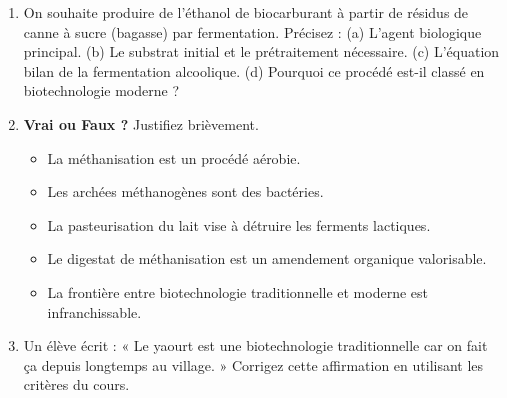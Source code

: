 \documentclass[11pt]{article}
\begin{document}
\begin{exercice}
\begin{enumerate}
\item On souhaite produire de l'éthanol de biocarburant à partir de résidus de canne à sucre (bagasse) par fermentation. Précisez : (a) L'agent biologique principal. (b) Le substrat initial et le prétraitement nécessaire. (c) L'équation bilan de la fermentation alcoolique. (d) Pourquoi ce procédé est-il classé en biotechnologie moderne ?
\item \textbf{Vrai ou Faux ?} Justifiez brièvement.
\begin{itemize}
\item[a)] La méthanisation est un procédé aérobie.
\item[b)] Les archées méthanogènes sont des bactéries.
\item[c)] La pasteurisation du lait vise à détruire les ferments lactiques.
\item[d)] Le digestat de méthanisation est un amendement organique valorisable.
\item[e)] La frontière entre biotechnologie traditionnelle et moderne est infranchissable.
\end{itemize}
\item Un élève écrit : « Le yaourt est une biotechnologie traditionnelle car on fait ça depuis longtemps au village. » Corrigez cette affirmation en utilisant les critères du cours.
\end{enumerate}
\end{exercice}
\end{document}
